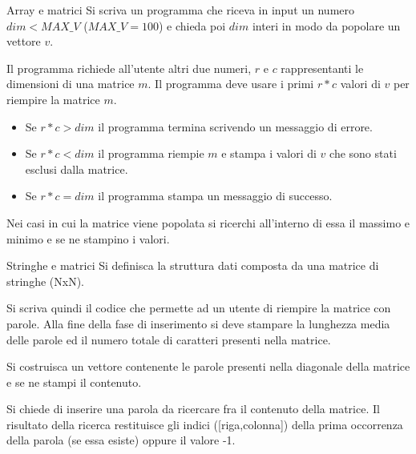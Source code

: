 \documentclass[format=169]{beamer}
\begin{document}
\begin{frame}{Array e matrici}
Si scriva un programma che riceva in input un numero $dim<MAX\_V$ ($MAX\_V=100$) e chieda poi $dim$ interi in modo da popolare un vettore $v$. 

Il programma richiede all’utente altri due numeri, $r$ e $c$ rappresentanti le dimensioni di una matrice $m$.
Il programma deve usare i primi $r*c$ valori di $v$ per riempire la matrice $m$.

\begin{itemize}
	\item Se $r*c > dim$ il programma termina scrivendo un messaggio di errore.
	\item Se $r*c < dim$ il programma riempie $m$ e stampa i valori di $v$ che sono stati esclusi
	dalla matrice.
	\item Se $r*c = dim$ il programma stampa un messaggio di successo.
\end{itemize}

Nei casi in cui la matrice viene popolata si ricerchi all’interno di essa il massimo e minimo e se ne
stampino i valori.
\end{frame}

\begin{frame}{Stringhe e matrici}
Si definisca la struttura dati composta da una matrice di stringhe (NxN).

Si scriva quindi il codice che permette ad un utente di riempire la matrice con parole.
Alla fine della fase di inserimento si deve stampare la lunghezza media delle parole ed il numero
totale di caratteri presenti nella matrice.

Si costruisca un vettore contenente le parole presenti nella diagonale della matrice e se ne stampi
il contenuto.

Si chiede di inserire una parola da ricercare fra il contenuto della matrice. Il risultato della ricerca restituisce gli indici ([riga,colonna]) della prima occorrenza della parola (se essa esiste) oppure il valore -1.
\end{frame}
\end{document}
